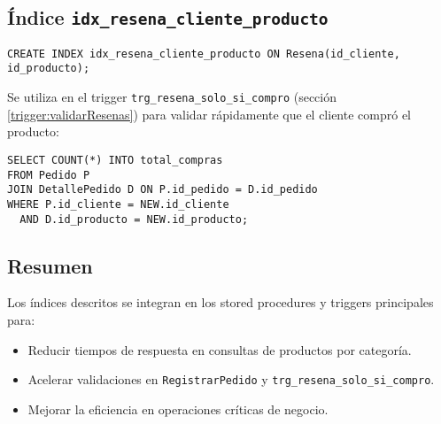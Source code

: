 \subsection{Índice \texttt{idx\_resena\_cliente\_producto}}
\begin{lstlisting}
CREATE INDEX idx_resena_cliente_producto ON Resena(id_cliente, id_producto);
\end{lstlisting}

Se utiliza en el trigger \texttt{trg\_resena\_solo\_si\_compro} (sección \ref{trigger:validarResenas}) para validar rápidamente que el cliente compró el producto:
\begin{lstlisting}
SELECT COUNT(*) INTO total_compras
FROM Pedido P
JOIN DetallePedido D ON P.id_pedido = D.id_pedido
WHERE P.id_cliente = NEW.id_cliente
  AND D.id_producto = NEW.id_producto;
\end{lstlisting}

\subsection{Resumen}

Los índices descritos se integran en los stored procedures y triggers principales para:
\begin{itemize}
  \item Reducir tiempos de respuesta en consultas de productos por categoría.
  \item Acelerar validaciones en \texttt{RegistrarPedido} y \texttt{trg\_resena\_solo\_si\_compro}.
  \item Mejorar la eficiencia en operaciones críticas de negocio.
\end{itemize}
